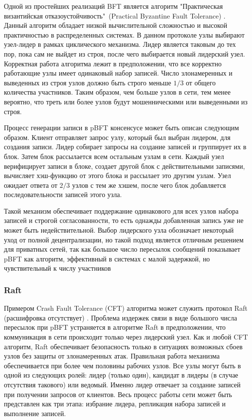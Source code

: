 \documentclass[subf, href, colorlinks=true, 14pt,
times, mtpro, specialist]{disser}
\theoremstyle{definition}
\begin{document}
Одной из простейших реализаций BFT является алгоритм "Практическая византийская отказоустойчивость"\ (Practical Byzantine Fault Tolerance) \cite{Byzantine_Fault_Tolerance}. Данный алгоритм обладает низкой вычислительной сложностью и высокой практичностью в распределенных системах. В данном протоколе узлы выбирают узел-лидер в рамках циклического механизма. Лидер является таковым до тех пор, пока сам не выйдет из строя, после чего выбирается новый лидерский узел. Корректная работа алгоритма лежит в предположении, что все корректно работающие узлы имеет одинаковый набор записей. Число злонамеренных и выведенных из строя узлов должно быть строго меньше $1/3$ от общего количества участников. Таким образом, чем больше узлов в сети, тем менее вероятно, что треть или более узлов будут мошенническими или выведенными из строя. 

Процесс генерации записи в pBFT консенсусе может быть описан следующим образом. Клиент отправляет запрос узлу, который был выбран лидером, для создания записи. Лидер собирает запросы на создание записей и группирует их в блок. Затем блок рассылается всем остальным узлам в сети. Каждый узел верифицирует записи в блоке, создает другой блок с действительными записями, вычисляет хэш-функцию от этого блока и рассылает это другим узлам. Узел ожидает ответа от $2/3$ узлов с тем же хэшем, после чего блок добавляется последовательности записей этого узла.

Такой механизм обеспечивает поддержание одинакового для всех узлов набора записей и строгой согласованности, то есть однажды добавленная запись уже не может быть недействительной. Выбор лидерского узла обозначает некоторый уход от полной децентрализации, но такой подход является отличным решением для приватных сетей, так как большое число пересылок сообщений показывает pBFT как алгоритм, эффективный в системах с малой задержкой, но чувствительный к числу участников

\subsubsection{Raft}

Примером Crash Fault Tolerance (CFT) алгоритма может служить протокол Raft (расшифровка отсутствует) \cite{Raft_search}. Проблема издержек связи в виде большого числа пересылок при pBFT устраняется в алгоритме Raft в предположении, что коммуникация в сети происходит только через лидерский узел. Как и любой CFT алгоритм, Raft обеспечивает безопасность только в ситуациях возможных сбоев узлов без защиты от злонамеренных атак. Правильная работа механизма обеспечивается при более чем половины рабочих узлов. Все узлы могут быть в одной из следующих ролей: лидер (только один), кандидат в лидеры (в случае отсутствия такового) или ведомый. Именно лидер отвечает за создание записей при получении запросов от клиентов. Весь процесс работы сети может быть представлен как три этапа: избрание лидера, репликация набора записей и выполнение записей.
\end{document}
